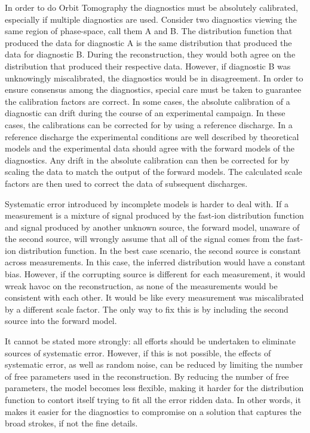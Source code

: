 In order to do Orbit Tomography the diagnostics must be absolutely calibrated, especially if multiple diagnostics are used.
Consider two diagnostics viewing the same region of phase-space, call them A and B.
The distribution function that produced the data for diagnostic A is the same distribution that produced the data for diagnostic B.
During the reconstruction, they would both agree on the distribution that produced their respective data.
However, if diagnostic B was unknowingly miscalibrated, the diagnostics would be in disagreement.
In order to ensure consensus among the diagnostics, special care must be taken to guarantee the calibration factors are correct.
In some cases, the absolute calibration of a diagnostic can drift during the course of an experimental campaign.
In these cases, the calibrations can be corrected for by using a reference discharge. In a reference discharge the experimental conditions are well described by theoretical models and the experimental data should agree with the forward models of the diagnostics. Any drift in the absolute calibration can then be corrected for by scaling the data to match the output of the forward models. The calculated scale factors are then used to correct the data of subsequent discharges.

Systematic error introduced by incomplete models is harder to deal with.
If a measurement is a mixture of signal produced by the fast-ion distribution function and signal produced by another unknown source, the forward model, unaware of the second source, will wrongly assume that all of the signal comes from the fast-ion distribution function. In the best case scenario, the second source is constant across measurements. In this case, the inferred distribution would have a constant bias. However, if the corrupting source is different for each measurement, it would wreak havoc on the reconstruction, as none of the measurements would be consistent with each other. It would be like every measurement was miscalibrated by a different scale factor.  
The only way to fix this is by including the second source into the forward model.

It cannot be stated more strongly: all efforts should be undertaken to eliminate sources of systematic error.
However, if this is not possible, the effects of systematic error, as well as random noise, can be reduced by limiting the number of free parameters used in the reconstruction.
By reducing the number of free parameters, the model becomes less flexible, making it harder for the distribution function to contort itself trying to fit all the error ridden data.
In other words, it makes it easier for the diagnostics to compromise on a solution that captures the broad strokes, if not the fine details. 


